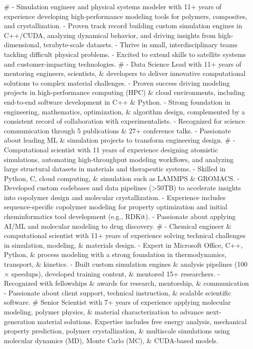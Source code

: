 #
- Simulation engineer and physical systems modeler with 11+ years of experience developing high-performance modeling tools for polymers, composites, and crystallization.
- Proven track record building custom simulation engines in C++/CUDA, analyzing dynamical behavior, and driving insights from high-dimensional, terabyte-scale datasets.
- Thrive in small, interdisciplinary teams tackling difficult physical problems.
- Excited to extend skills to satellite systems and customer-impacting technologies.
#
- Data Science Lead with 11+ years of mentoring engineers, scientists, \& developers to deliver innovative computational solutions to complex material challenges.
- Proven success driving modeling projects in high-performance computing (HPC) \& cloud environments, including end-to-end software development in C++ \& Python.
- Strong foundation in engineering, mathematics, optimization, \& algorithm design, complemented by a consistent record of collaboration with experimentalists.
- Recognized for science communication through 5 publications \& 27+ conference talks.
- Passionate about leading ML \& simulation projects to transform engineering design.
#
- Computational scientist with 11 years of experience designing atomistic simulations, automating high-throughput modeling workflows, and analyzing large structural datasets in materials and therapeutic systems.
- Skilled in Python, C, cloud computing, \& simulation such as LAMMPS \& GROMACS.
- Developed custom codebases and data pipelines (>50TB) to accelerate insights into copolymer design and molecular crystallization.
- Experience includes sequence-specific copolymer modeling for property optimization and initial cheminformatics tool development (e.g., RDKit).
- Passionate about applying AI/ML and molecular modeling to drug discovery.
#
- Chemical engineer \& computational scientist with 11+ years of experience solving technical challenges in simulation, modeling, \& materials design.
- Expert in Microsoft Office, C++, Python, \& process modeling with a strong foundation in thermodynamics, transport, \& kinetics.
- Built custom simulation engines \& analysis pipelines (100$\times$ speedups), developed training content, \& mentored 15+ researchers.
- Recognized with fellowships \& awards for research, mentorship, \& communication
- Passionate about client support, technical instruction, \& scalable scientific software.
#
Senior Scientist with 7+ years of experience applying molecular modeling, polymer physics, \& material characterization to advance next-generation material solutions.
Expertise includes free energy analysis, mechanical property prediction, polymer crystallization, \& multiscale simulations using molecular dynamics (MD), Monte Carlo (MC), \& CUDA-based models.

